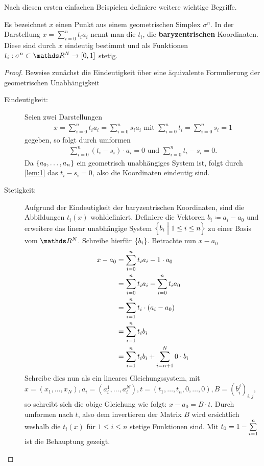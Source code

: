 
Nach diesen ersten einfachen Beispielen definiere weitere wichtige
Begriffe.

\begin{Lem}
  \normalfont Es bezeichnet $x$ einen Punkt aus einem geometrischen Simplex
  $\sigma^n$. In der Darstellung $x = \sum\limits_{i=0}^n t_i a_i$ nennt
  man die $t_i$, die \textbf{baryzentrischen} Koordinaten. Diese sind durch $x$
  eindeutig bestimmt und als Funktionen $t_i : \sigma^n \subset \R^N \rightarrow [0,1]$ stetig.
  \begin{proof}
  	Beweise zunächst die Eindeutigkeit über eine äquivalente Formulierung der
  	geometrischen Unabhängigkeit 
  	\begin{description}
  		\item[Eindeutigkeit: ] Seien zwei Darstellungen 
	  		\begin{gather*}
	  		x = \sum\limits_{i=0}^n t_i a_i = \sum\limits_{i=0}^n s_i a_i \text{ mit }
	  		\sum\limits_{i=0}^n t_i = \sum\limits_{i=0}^n s_i = 1
	  		\end{gather*}
		  	gegeben, so folgt durch umformen
		  	\begin{gather*}
		  		\sum\limits_{i=0}^n (t_i - s_i ) \cdot a_i = 0 \text{ und }
		  		\sum\limits_{i=0}^n t_i - s_i = 0.
		  	\end{gather*}
		  	Da $\sset{a_0 , \ldots , a_n}$ ein geometrisch unabhängiges System ist, folgt durch \cref{lem:1} das $t_i - s_i = 0$,
		  	also die Koordinaten eindeutig sind.
  		\item[Stetigkeit: ] Aufgrund der Eindeutigkeit der baryzentrischen
	  		Koordinaten, sind die Abbildungen $t_i (x)$ wohldefiniert.
		  	Definiere die Vektoren $b_i \coloneqq a_i - a_0$ und
		  	erweitere das linear unabhängige System $\set{ b_i }{ 1 \leq i \leq n}$ zu einer Basis	vom $\R^N$. Schreibe hierfür $\sset{ b_i }$.	Betrachte nun $x - a_0$
		  	\begin{align*}
		  		x - a_0 &= \sp{0}{n} t_i a_i - 1 \cdot a_0\\
				  		&= \sp{0}{n} t_i a_i - \sp{0}{n} t_i a_0\\
				  		&= \sp{1}{n} t_i \cdot (a_i - a_0)\\
				  		&= \sp{1}{n} t_i b_i\\
				  		&= \sp{1}{n} t_i b_i + \sp{n+1}{N} 0 \cdot b_i
		  	\end{align*}
		  	Schreibe dies nun als ein lineares Gleichungssystem, mit
		  	$x=(x_1,\ldots,x_N),a_i=(a_i^1,\ldots,a_i^N),t=(t_1,\ldots,t_n,0,\ldots,0),B=(b_i^j)_{i,j}$,
		  	so schreibt sich die obige Gleichung wie folgt: $x-a_0 = B\cdot t$. Durch umformen nach $t$, also dem invertieren der Matrix $B$ 
		  	wird ersichtlich weshalb die $t_i(x)$ für $1 \leq i \leq n$
		  	stetige Funktionen sind. Mit $t_0 = 1 - \sp{1}{n}$ ist die
		  	Behauptung gezeigt.
  	\end{description}
  \end{proof}
	

\end{Lem}
